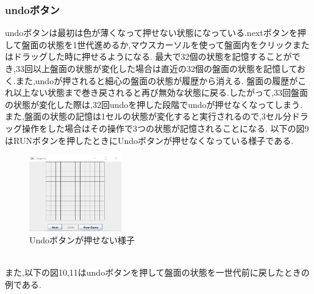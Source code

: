 \documentclass[dvipdfmx]{jarticle}
\begin{document}
\subsubsection{undoボタン}
undoボタンは最初は色が薄くなって押せない状態になっている.nextボタンを押して盤面の状態を1世代進めるか,マウスカーソルを使って盤面内をクリックまたはドラッグした時に押せるようになる.
最大で32個の状態を記憶することができ,33回以上盤面の状態が変化した場合は直近の32個の盤面の状態を記憶しておく.また,undoが押されると細心の盤面の状態が履歴から消える.
盤面の履歴がこれ以上ない状態まで巻き戻されると再び無効な状態に戻る.したがって,33回盤面の状態が変化した際は,32回undoを押した段階でundoが押せなくなってしまう.
また,盤面の状態の記憶は1セルの状態が変化すると実行されるので,3セル分ドラッグ操作をした場合はその操作で3つの状態が記憶されることになる.
以下の図9はRUNボタンを押したときにUndoボタンが押せなくなっている様子である.
\begin{figure}[h]
  \centering
  \includegraphics[width=4cm]{panel_normal.png}
  \caption{Undoボタンが押せない様子}
\end{figure}
\\また,以下の図10,11はundoボタンを押して盤面の状態を一世代前に戻したときの例である.
\end{document}
